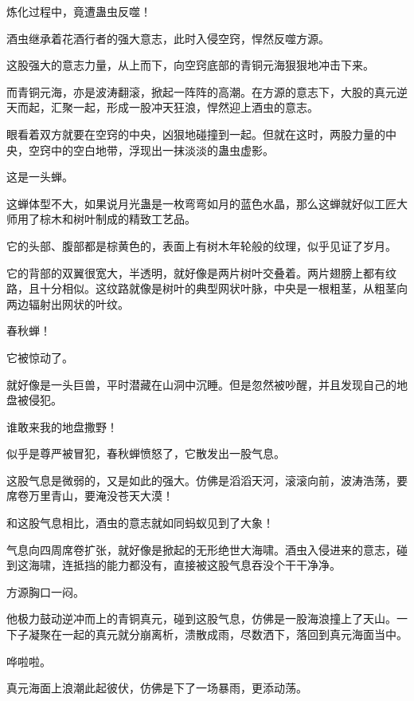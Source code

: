 
\begin{this_body}



炼化过程中，竟遭蛊虫反噬！

酒虫继承着花酒行者的强大意志，此时入侵空窍，悍然反噬方源。

这股强大的意志力量，从上而下，向空窍底部的青铜元海狠狠地冲击下来。

而青铜元海，亦是波涛翻滚，掀起一阵阵的高潮。在方源的意志下，大股的真元逆天而起，汇聚一起，形成一股冲天狂浪，悍然迎上酒虫的意志。

眼看着双方就要在空窍的中央，凶狠地碰撞到一起。但就在这时，两股力量的中央，空窍中的空白地带，浮现出一抹淡淡的蛊虫虚影。

这是一头蝉。

这蝉体型不大，如果说月光蛊是一枚弯弯如月的蓝色水晶，那么这蝉就好似工匠大师用了棕木和树叶制成的精致工艺品。

它的头部、腹部都是棕黄色的，表面上有树木年轮般的纹理，似乎见证了岁月。

它的背部的双翼很宽大，半透明，就好像是两片树叶交叠着。两片翅膀上都有纹路，且十分相似。这纹路就像是树叶的典型网状叶脉，中央是一根粗茎，从粗茎向两边辐射出网状的叶纹。

春秋蝉！

它被惊动了。

就好像是一头巨兽，平时潜藏在山洞中沉睡。但是忽然被吵醒，并且发现自己的地盘被侵犯。

谁敢来我的地盘撒野！

似乎是尊严被冒犯，春秋蝉愤怒了，它散发出一股气息。

这股气息是微弱的，又是如此的强大。仿佛是滔滔天河，滚滚向前，波涛浩荡，要席卷万里青山，要淹没苍天大漠！

和这股气息相比，酒虫的意志就如同蚂蚁见到了大象！

气息向四周席卷扩张，就好像是掀起的无形绝世大海啸。酒虫入侵进来的意志，碰到这海啸，连抵挡的能力都没有，直接被这股气息吞没个干干净净。

方源胸口一闷。

他极力鼓动逆冲而上的青铜真元，碰到这股气息，仿佛是一股海浪撞上了天山。一下子凝聚在一起的真元就分崩离析，溃散成雨，尽数洒下，落回到真元海面当中。

哗啦啦。

真元海面上浪潮此起彼伏，仿佛是下了一场暴雨，更添动荡。


\end{this_body}
